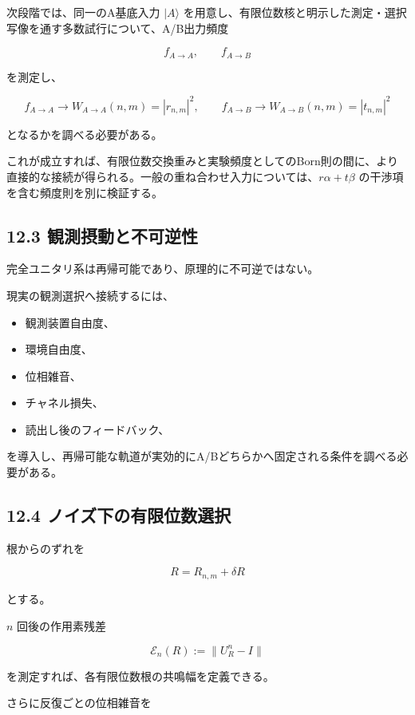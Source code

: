\documentclass[
  a4paper,
  10pt]{article}
\providecommand{\tightlist}{%
  \setlength{\itemsep}{0pt}\setlength{\parskip}{0pt}}
\begin{document}
次段階では、同一のA基底入力 \(|A\rangle\)
を用意し、有限位数核と明示した測定・選択写像を通す多数試行について、A/B出力頻度

\[
f_{A\to A},
\qquad
f_{A\to B}
\]

を測定し、

\[
f_{A\to A}\rightarrow W_{A\to A}(n,m)=|r_{n,m}|^2,
\qquad
f_{A\to B}\rightarrow W_{A\to B}(n,m)=|t_{n,m}|^2
\]

となるかを調べる必要がある。

これが成立すれば、有限位数交換重みと実験頻度としてのBorn則の間に、より直接的な接続が得られる。一般の重ね合わせ入力については、\(r\alpha+t\beta\)
の干渉項を含む頻度則を別に検証する。

\subsection{12.3
観測摂動と不可逆性}\label{123-ux89b3ux6e2cux6442ux52d5ux3068ux4e0dux53efux9006ux6027}

完全ユニタリ系は再帰可能であり、原理的に不可逆ではない。

現実の観測選択へ接続するには、

\begin{itemize}
\tightlist
\item
  観測装置自由度、
\item
  環境自由度、
\item
  位相雑音、
\item
  チャネル損失、
\item
  読出し後のフィードバック、
\end{itemize}

を導入し、再帰可能な軌道が実効的にA/Bどちらかへ固定される条件を調べる必要がある。

\subsection{12.4
ノイズ下の有限位数選択}\label{124-ux30ceux30a4ux30baux4e0bux306eux6709ux9650ux4f4dux6570ux9078ux629e}

根からのずれを

\[
R=R_{n,m}+\delta R
\]

とする。

\(n\) 回後の作用素残差

\[
\mathcal E_n(R)
:=
\|U_R^n-I\|
\]

を測定すれば、各有限位数根の共鳴幅を定義できる。

さらに反復ごとの位相雑音を
\end{document}
